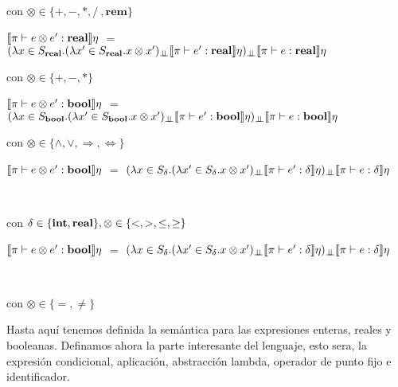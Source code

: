 \begin{center}
con $\otimes \in \{+,-,*,/\ , \textbf{rem}\}$
\end{center}

\noindent
$\llbracket \pi \vdash e \otimes e' : \textbf{real} \rrbracket\eta$ $=$ \\
				\indent \indent \indent $(\lambda x \in S_{\textbf{real}} . 
											(\lambda x' \in S_{\textbf{real}} . x \otimes x')_{\bot \!\!\! \bot}
													\llbracket \pi \vdash e' : \textbf{real} \rrbracket\eta)_{\bot \!\!\! \bot}
														\llbracket \pi \vdash e : \textbf{real} \rrbracket\eta$

\begin{center}
con $\otimes \in \{+,-,*\}$
\end{center}

\noindent
$\llbracket \pi \vdash e \otimes e' : \textbf{bool} \rrbracket\eta$ $=$ \\
				\indent \indent \indent $(\lambda x \in S_{\textbf{bool}} . 
											(\lambda x' \in S_{\textbf{bool}} . x \otimes x')_{\bot \!\!\! \bot}
													\llbracket \pi \vdash e' : \textbf{bool} \rrbracket\eta)_{\bot \!\!\! \bot}
														\llbracket \pi \vdash e : \textbf{bool} \rrbracket\eta$

\begin{center}
con $\otimes \in \{\wedge,\vee,\Rightarrow,\Leftrightarrow\}$
\end{center}

\begin{center}

$\llbracket \pi \vdash e \otimes e' : \textbf{bool} \rrbracket\eta$ $=$ $(\lambda x \in S_\delta . 
											(\lambda x' \in S_\delta . x \otimes x')_{\bot \!\!\! \bot}
													\llbracket \pi \vdash e' : \delta \rrbracket\eta)_{\bot \!\!\! \bot}
														\llbracket \pi \vdash e : \delta \rrbracket\eta$

\

con $\delta \in \{\textbf{int}, \textbf{real} \}, \otimes \in \{<,>,\leq,\geq\}$
\end{center}

\begin{center}

$\llbracket \pi \vdash e \otimes e' : \textbf{bool} \rrbracket\eta$ $=$ $(\lambda x \in S_\delta . 
											(\lambda x' \in S_\delta . x \otimes x')_{\bot \!\!\! \bot}
													\llbracket \pi \vdash e' : \delta \rrbracket\eta)_{\bot \!\!\! \bot}
														\llbracket \pi \vdash e : \delta \rrbracket\eta$

\

con $\otimes \in \{=,\neq\}$
\end{center}

Hasta aqu\'i tenemos definida la sem\'antica para las expresiones enteras,
reales y booleanas. Definamos ahora la parte interesante del lenguaje, esto 
sera, la expresi\'on condicional, aplicaci\'on, abstracci\'on lambda, operador
de punto fijo e identificador.

